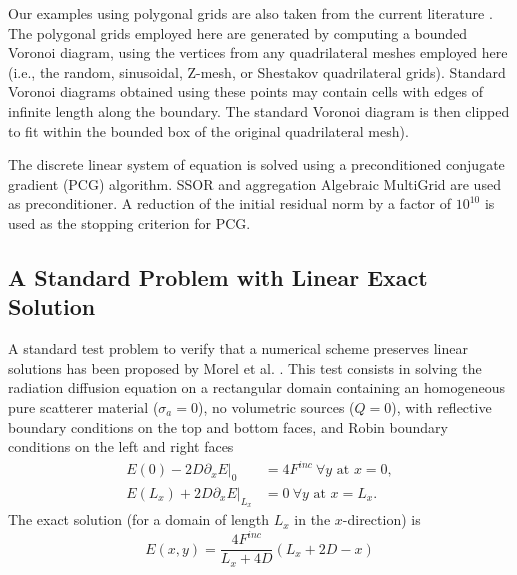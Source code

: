\documentclass[preprint,10pt]{elsarticle}
\begin{document}
Our examples using polygonal grids are also taken from the current literature 
\cite{Kuznetsov2004,Brezzi2005,BaileyAdams2008}.
The polygonal grids employed here are generated by computing a bounded Voronoi diagram, using the 
vertices from any quadrilateral meshes employed here (i.e., the random, sinusoidal, Z-mesh, 
or Shestakov quadrilateral grids). Standard Voronoi diagrams obtained using these points 
may contain cells with edges of infinite length along the boundary. The standard Voronoi diagram 
is then clipped to fit within the bounded box of the original quadrilateral mesh).

The discrete linear system of equation is solved using a preconditioned conjugate gradient (PCG) algorithm. 
SSOR and aggregation Algebraic MultiGrid \cite{agmg}  are used as preconditioner. A reduction of the
initial residual norm by a factor of $10^{10}$ is used as the stopping criterion for PCG. 

\subsection{A Standard Problem with Linear Exact Solution} \label{sec:results_linear}
A standard test problem to verify that a numerical scheme preserves linear solutions has been
proposed by Morel et al. \cite{Morel1992}. This test consists
in solving the radiation diffusion equation on a rectangular domain containing an homogeneous pure 
scatterer material ($\sigma_a=0$), no volumetric sources ($Q=0$), with reflective boundary conditions 
on the top and bottom faces, and Robin boundary conditions on the left and right faces
\begin{align}
  E(0) - 2 D \left.\partial_x E\right|_0 &= 4F^{inc} \ \forall y \textrm{ at } x=0, \\
  E(L_x) + 2 D \left.\partial_x E\right|_{L_x} &= 0 \ \forall y \textrm{ at } x=L_x.
\end{align}
The exact solution (for a domain of length $L_x$ in the $x$-direction) is
\begin{equation}
E(x,y) = 	\frac{4F^{inc}}{L_x+4D}\left(L_x+2D-x \right)
\end{equation}
\end{document}
